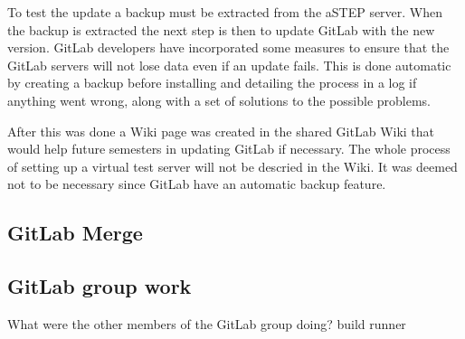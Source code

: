 
To test the update a backup must be extracted from the aSTEP server. %
When the backup is extracted the next step is then to update GitLab with the new version. GitLab developers have incorporated some measures to ensure that the GitLab servers will not lose data even if an update fails. This is done automatic by creating a backup before installing and detailing the process in a log if anything went wrong, along with a set of solutions to the possible problems.

After this was done a Wiki page was created in the shared GitLab Wiki that would help future semesters in updating GitLab if necessary. The whole process of setting up a virtual test server will not be descried in the Wiki. It was deemed not to be necessary since GitLab have an automatic backup feature.

\subsection{GitLab Merge}

\subsection{GitLab group work}
What were the other members of the GitLab group doing? 
build
runner

